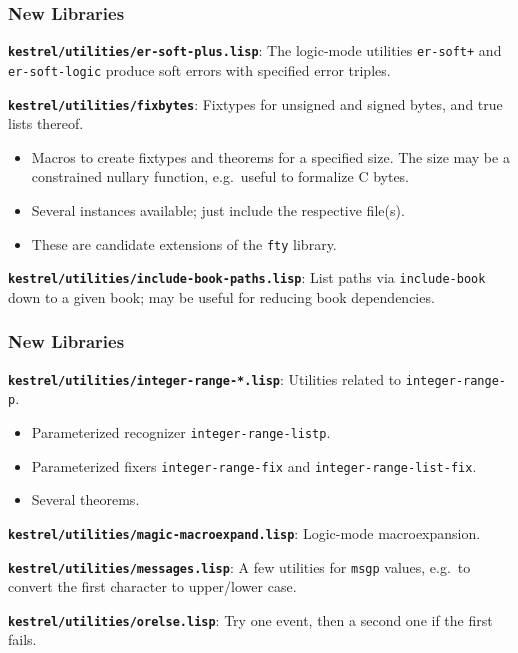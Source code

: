 \documentclass{beamer}
\newcommand{\code}[1]{\texttt{#1}}
\newcommand{\bookpath}[1]{\textbf{\code{#1}}}
\newcommand{\newlibtitle}{\frametitle{New Libraries}}
\newcommand{\separation}{\vspace*{1ex}}
\begin{document}
\begin{frame}

\newlibtitle

\bookpath{kestrel/utilities/er-soft-plus.lisp}:
The logic-mode utilities \code{er-soft+} and \code{er-soft-logic} produce
soft errors with specified error triples.

\separation

\bookpath{kestrel/utilities/fixbytes}:
Fixtypes for unsigned and signed bytes, and true lists thereof.
\begin{itemize}
\item
Macros to create fixtypes and theorems for a specified size.
The size may be a constrained nullary function,
e.g.\ useful to formalize C bytes.
\item
Several instances available; just include the respective file(s).
\item
These are candidate extensions of the \code{fty} library.
\end{itemize}

\separation

\bookpath{kestrel/utilities/include-book-paths.lisp}:
List paths via \code{include-book} down to a given book; may be useful
for reducing book dependencies.

\end{frame}


\begin{frame}

\newlibtitle

\bookpath{kestrel/utilities/integer-range-*.lisp}:
Utilities related to \code{integer-range-p}.
\begin{itemize}
\item
Parameterized recognizer \code{integer-range-listp}.
\item
Parameterized fixers
\code{integer-range-fix} and \code{integer-range-list-fix}.
\item
Several theorems.
\end{itemize}

\separation

\bookpath{kestrel/utilities/magic-macroexpand.lisp}:
Logic-mode macroexpansion.

\separation

\bookpath{kestrel/utilities/messages.lisp}:
A few utilities for \code{msgp} values,
e.g.\ to convert the first character to upper/lower case.

\separation

\bookpath{kestrel/utilities/orelse.lisp}:
Try one event, then a second one if the first fails.

\end{frame}
\end{document}
